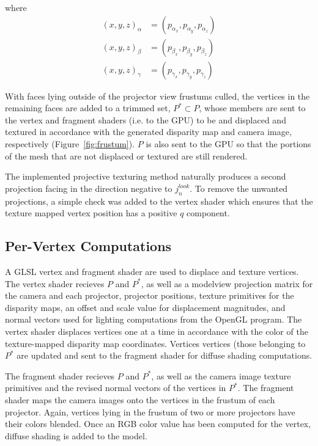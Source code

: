 \documentclass[a4paper,twoside]{article}
\begin{document}
where
\begin{align}
\nonumber
(x, y, z)_{\alpha} &= (p_{\alpha_{x}}, p_{\alpha_{y}}, p_{\alpha_{z}})\\
\nonumber
(x, y, z)_{\beta} &= (p_{\beta_{x}}, p_{\beta_{y}}, p_{\beta_{z}})\\
(x, y, z)_{\gamma} &= (p_{\gamma_{x}}, p_{\gamma_{y}}, p_{\gamma_{z}})
\end{align}


With faces lying outside of the projector view frustums culled, the vertices in the remaining faces are added to a trimmed set, $P^{*}\subset P$, whose members are sent to the vertex and fragment shaders (i.e. to the GPU) to be and displaced and textured in accordance with the generated disparity map and camera image, respectively (Figure~\ref{fig:frustum}). $P$ is also sent to the GPU so that the portions of the mesh that are not displaced or textured are still rendered.

The implemented projective texturing method naturally produces a second projection facing in the direction negative to $j_{n}^{look}$. To remove the unwanted projections, a simple check was added to the vertex shader which ensures that the texture mapped vertex position has a positive $q$ component.

\subsection{Per-Vertex Computations}

A GLSL vertex and fragment shader are used to displace and texture vertices. The vertex shader recieves $P$ and $P^{*}$, as well as a modelview projection matrix for the camera and each projector, projector positions, texture primitives for the disparity maps, an offset and scale value for displacement magnitudes, and normal vectors used for lighting computations from the OpenGL program. The vertex shader displaces vertices one at a time in accordance with the color of the texture-mapped disparity map coordinates. Vertices vertices (those belonging to $P^{*}$ are updated and sent to the fragment shader for diffuse shading computations.

The fragment shader recieves $P$ and $P^{*}$, as well as the camera image texture primitives and the revised normal vectors of the vertices in $P^{*}$. The fragment shader maps the camera images onto the vertices in the frustum of each projector. Again, vertices lying in the frustum of two or more projectors have their colors blended. Once an RGB color value has been computed for the vertex, diffuse shading is added to the model.
\end{document}
